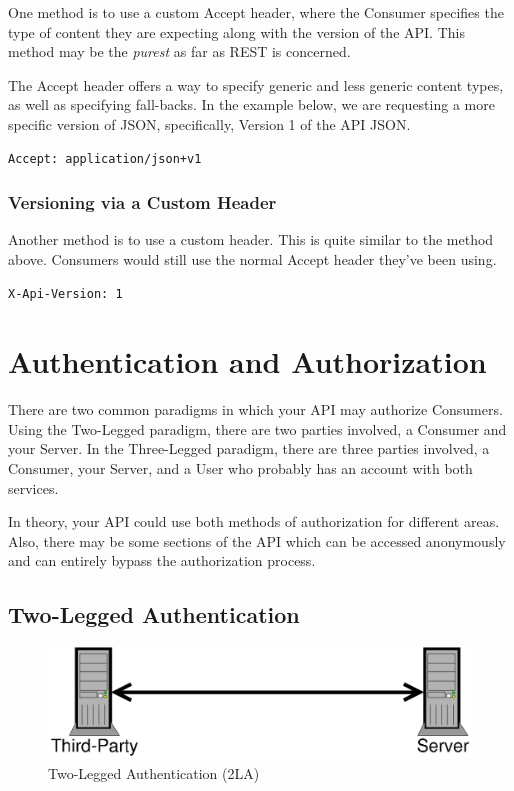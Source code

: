 \documentclass{book}
\begin{document}
One method is to use a custom Accept header, where the Consumer specifies the type of content they are expecting along with the version of the API. This method may be the \emph{purest} as far as REST is concerned.

The Accept header offers a way to specify generic and less generic content types, as well as specifying fall-backs. In the example below, we are requesting a more specific version of JSON, specifically, Version 1 of the API JSON.

\begin{verbatim}
Accept: application/json+v1
\end{verbatim}

\subsubsection{Versioning via a Custom Header}

Another method is to use a custom header. This is quite similar to the method above. Consumers would still use the normal Accept header they've been using.

\begin{verbatim}
X-Api-Version: 1
\end{verbatim}

\section{Authentication and Authorization}

There are two common paradigms in which your API may authorize Consumers. Using the Two-Legged paradigm, there are two parties involved, a Consumer and your Server. In the Three-Legged paradigm, there are three parties involved, a Consumer, your Server, and a User who probably has an account with both services.

In theory, your API could use both methods of authorization for different areas. Also, there may be some sections of the API which can be accessed anonymously and can entirely bypass the authorization process.

\subsection{Two-Legged Authentication}

\begin{figure}[!htb]
\centering
\includegraphics[scale=.6]{images/two-legged.eps}
\caption{Two-Legged Authentication (2LA)}
\label{fig:twolegged}
\end{figure}
\end{document}
